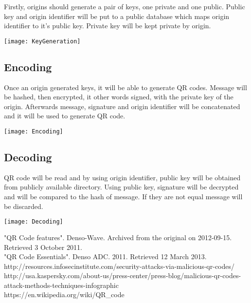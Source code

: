 \documentclass[12pt,journal,compsoc]{IEEEtran}
\begin{document}
Firstly, origins should generate a pair of keys, one private and one public. Public key and origin identifier will be put to a public database which maps origin identifier to it's public key. Private key will be kept private by origin.


\begin{center}
\texttt{[image: KeyGeneration]}
\end{center}

\subsection{Encoding}

Once an origin generated keys, it will be able to generate QR codes. Message will be hashed, then encrypted, it other words signed, with the private key of the origin. Afterwards message, signature and origin identifier will be concatenated and it will be used to generate QR code.

\begin{center}
\texttt{[image: Encoding]}
\end{center}


\subsection{Decoding}

QR code will be read and by using origin identifier, public key will be obtained from publicly available directory. Using public key, signature will be decrypted and will be compared to the hash of message. If they are not equal message will be discarded. 


\begin{center}
\texttt{[image: Decoding]}
\end{center}


\begin{thebibliography}{1}

"QR Code features". Denso-Wave. Archived from the original on 2012-09-15. Retrieved 3 October 2011. \\

"QR Code Essentials". Denso ADC. 2011. Retrieved 12 March 2013. \\


http://resources.infosecinstitute.com/security-attacks-via-malicious-qr-codes/ \\


http://usa.kaspersky.com/about-us/press-center/press-blog/malicious-qr-codes-attack-methods-techniques-infographic \\

https://en.wikipedia.org/wiki/QR_code \\

\end{thebibliography}
\end{document}

